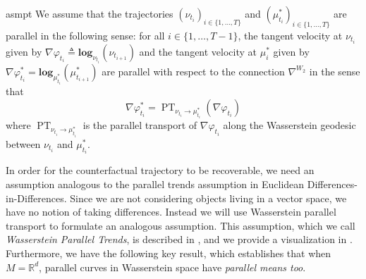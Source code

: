 \documentclass[11pt]{article}
\newcommand{\ndfg}[1]{{\color{magenta}[Florian: #1]}}
\newcommand{\man}{M}
\newcommand{\PT}{\operatorname{PT}}
\begin{document}
\begin{restatable}{asmpt}{} \label{Wasserstein parallel trends}
    We assume that the trajectories $(\nu_{t_i})_{i\in \{1, \dots, T\}}$ and $(\mu_{t_i}^*)_{i\in \{1, \dots, T\}}$ are parallel in the following sense: for all $i \in \{1, \dots, T-1\}$, the tangent velocity at $\nu_{t_i}$ given by $\nabla \varphi_{t_i} \triangleq \mathbf{log}_{\nu_{t_i}}(\nu_{t_{i+1}})$ and the tangent velocity at $\mu_i^*$ given by $\nabla\varphi_{t_i}^* =  \mathbf{log}_{\mu_{t_i}^*}(\mu_{t_{i+1}}^*)$ are parallel with respect to the connection $\nabla^{W_2}$ in the sense that
    \[\nabla\varphi_{t_i}^* = {\PT}_{\nu_{t_i} \rightarrow \mu_{t_i}^*}(\nabla \varphi_{t_i})\]
    where ${\PT}_{\nu_{t_i} \rightarrow \mu_{t_i}^*}$ is the parallel transport of $\nabla\varphi_{t_i}$ along the Wasserstein geodesic between $\nu_{t_i}$ and $\mu_{t_i}^*$.
\end{restatable}

In order for the counterfactual trajectory to be recoverable, we need an assumption analogous to the parallel trends assumption in Euclidean Differences-in-Differences. Since we are not considering objects living in a vector space, we have no notion of taking differences. Instead we will use Wasserstein parallel transport to formulate an analogous assumption. This assumption, which we call \textit{Wasserstein Parallel Trends}, is described in , and we provide a visualization in . Furthermore, we have the following key result, which establishes that when $\man = \mathbb{R}^d$, parallel curves in Wasserstein space have \textit{parallel means too}. 
\end{document}

